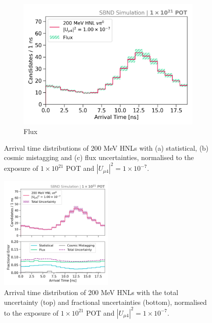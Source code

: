 \begin{figure}[htbp!]
\begin{subfigure}[b]{0.45\textwidth}
            \includegraphics[width=\textwidth]{hnl_flux_error}
            \caption{Flux}%
            \label{fig:hnl_flux}
        \end{subfigure}
	\caption[Uncertainties of Heavy Neutral Leptons]{
		Arrival time distributions of 200 MeV HNLs with (a) statistical, (b) cosmic mistagging and (c) flux uncertainties, normalised to the exposure of $1 \times 10^{21}$ POT and $|U_{\mu4}|^2 = 1 \times 10^{-7}$.
	} 
        \label{fig:hnl_error}
\vspace{0.25cm}
\centering    
\includegraphics[width=0.5\textwidth]{hnl_error}
\caption[Total Uncertainty and Fractional Uncertainties of Heavy Neutral Leptons]{
Arrival time distribution of 200 MeV HNLs with the total uncertainty (top) and fractional uncertainties (bottom), normalised to the exposure of $1 \times 10^{21}$ POT and $|U_{\mu4}|^2 = 1 \times 10^{-7}$.
}
\label{fig:hnl_total_error}
\end{figure}

